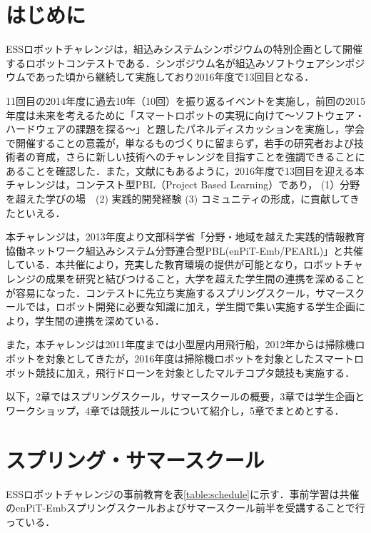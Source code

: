 \documentclass[submit]{ipsj}
\begin{document}
\maketitle

\section{はじめに}
ESSロボットチャレンジは，組込みシステムシンポジウムの特別企画として開催するロボットコンテストである．シンポジウム名が組込みソフトウェアシンポジウムであった頃から継続して実施しており2016年度で13回目となる．

11回目の2014年度に過去10年（10回）を振り返るイベントを実施し\cite{essrc2014}，前回の2015年度は未来を考えるために「スマートロボットの実現に向けて〜ソフトウェア・ハードウェアの課題を探る〜」と題したパネルディスカッションを実施し，学会で開催することの意義が，単なるものづくりに留まらず，若手の研究者および技術者の育成，さらに新しい技術へのチャレンジを目指すことを強調できることにあることを確認した\cite{essrc2015}．また，文献\cite{watanabe2016pbl}にもあるように，2016年度で13回目を迎える本チャレンジは，コンテスト型PBL（Project Based Learning）であり， (1）分野を超えた学びの場　(2) 実践的開発経験 (3) コミュニティの形成，に貢献してきたといえる．

本チャレンジは，2013年度より文部科学省「分野・地域を越えた実践的情報教育協働ネットワーク組込みシステム分野連合型PBL(enPiT-Emb/PEARL)」と共催している\cite{enpitweb}\cite{essrcweb}．本共催により，充実した教育環境の提供が可能となり，ロボットチャレンジの成果を研究と結びつけること，大学を超えた学生間の連携を深めることが容易になった．コンテストに先立ち実施するスプリングスクール，サマースクールでは，ロボット開発に必要な知識に加え，学生間で集い実施する学生企画により，学生間の連携を深めている．

また，本チャレンジは2011年度までは小型屋内用飛行船，2012年からは掃除機ロボットを対象としてきたが，2016年度は掃除機ロボットを対象としたスマートロボット競技に加え，飛行ドローンを対象としたマルチコプタ競技も実施する．

以下，2章ではスプリングスクール，サマースクールの概要，3章では学生企画とワークショップ，4章では競技ルールについて紹介し，5章でまとめとする．


\section{スプリング・サマースクール}

ESSロボットチャレンジの事前教育を表\ref{table:schedule}に示す．事前学習は共催のenPiT-Embスプリングスクールおよびサマースクール前半を受講することで行っている．
\end{document}
